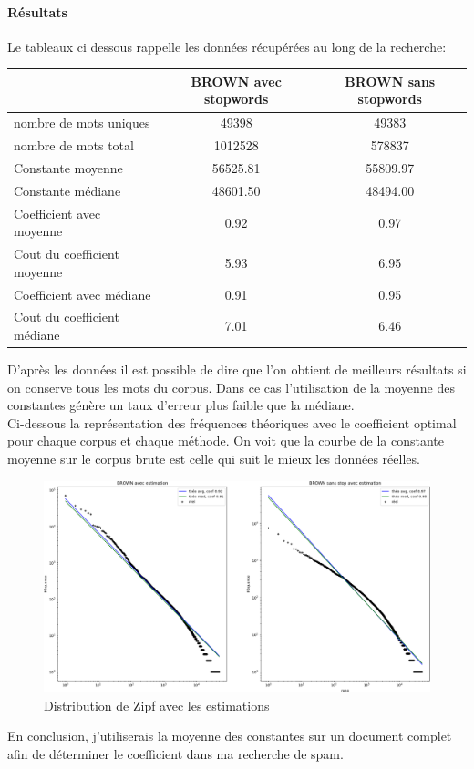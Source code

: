 	\paragraph{Résultats}

		Le tableaux ci dessous rappelle les données récupérées au long de la recherche:
		\begin{center}
			\begin{tabular}{|l|c|c|}
				\hline
				& BROWN avec stopwords & BROWN sans stopwords \\
				\hline
				nombre de mots uniques & 49398 & 49383 \\
				\hline
				nombre de mots total & 1012528 & 578837 \\
				\hline
				Constante moyenne & 56525.81 & 55809.97 \\
				\hline
				Constante médiane & 48601.50 & 48494.00 \\
				\hline
				Coefficient avec moyenne & 0.92 & 0.97 \\
				\hline
				Cout du coefficient moyenne & 5.93 & 6.95 \\
				\hline
				Coefficient avec médiane & 0.91 & 0.95 \\
				\hline
				Cout du coefficient médiane & 7.01  & 6.46 \\
				\hline
			\end{tabular}		
		\end{center}

		D'après les données il est possible de dire que l'on obtient de meilleurs résultats si on conserve tous les mots du corpus. Dans ce cas l'utilisation de la moyenne des constantes génère un taux d'erreur plus faible que la médiane.\\

		Ci-dessous la représentation des fréquences théoriques avec le coefficient optimal pour chaque corpus et chaque méthode. On voit que la courbe de la constante moyenne sur le corpus brute est celle qui suit le mieux les données réelles.
		\begin{figure}[H]
			\includegraphics[width=\linewidth]{img/zipfFin.png}
			\caption{Distribution de Zipf avec les estimations}
		\end{figure}

		En conclusion, j'utiliserais la moyenne des constantes sur un document complet afin de déterminer le coefficient dans ma recherche de spam.